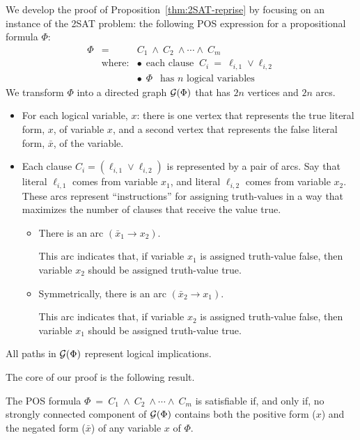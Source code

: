 We develop the proof of Proposition~\ref{thm:2SAT-reprise} by focusing on an instance of the {\sf 2SAT} problem: the following POS expression for a propositional formula $\Phi$:
\begin{eqnarray}
\label{eq:Phi-2SAT}
\Phi & = & C_1 \ \wedge \ C_2 \ \wedge \cdots \wedge \ C_m \\
\nonumber
  & \mbox{where:} & \bullet \ \ \mbox{each clause }
 \ C_i \ = \ \ell_{i,1} \vee \ell_{i,2} \\
\nonumber
  &               & \bullet \ \ \Phi \ \ \mbox{ has $n$ logical variables}
\end{eqnarray}
We transform $\Phi$ into a directed graph $\mbox{$\cal G$}(\Phi)$ that has $2n$ vertices and $2n$ arcs.
\begin{itemize}
\item
For each logical variable, $x$: there is one vertex that represents the {\sc true} literal form, $x$, of variable $x$, and a second vertex that represents the {\sc false} literal form, $\bar{x}$, of the
variable.
\medskip\item
Each clause $C_i = (\ell_{i,1} \vee \ell_{i,2})$ is represented by a pair of arcs.  Say that literal $\ell_{i,1}$ comes from variable $x_1$, and literal $\ell_{i,2}$ comes from variable $x_2$.  These arcs represent ``instructions'' for assigning truth-values in a way that maximizes the number of clauses that receive the value {\sc true}.
  \begin{itemize}
  \item
There is an arc $(\bar{x}_1 \rightarrow x_2)$.

\smallskip

This arc indicates that, if variable $x_1$ is assigned truth-value {\sc false}, then variable $x_2$ should be assigned truth-value {\sc true}.
  \medskip\item
Symmetrically, there is an arc $(\bar{x}_2 \rightarrow x_1)$.

\smallskip

This arc indicates that, if variable $x_2$ is assigned truth-value {\sc false}, then variable $x_1$ should be assigned truth-value {\sc true}.
  \end{itemize}
\end{itemize}
All paths in $\mbox{$\cal G$}(\Phi)$ represent logical implications. 

\medskip

The core of our proof is the following result.

\begin{prop}
\label{prop:2SAT}
The POS formula $\Phi \ = \ C_1 \ \wedge \ C_2 \ \wedge \cdots \wedge \ C_m$ is satisfiable if, and only if, no strongly connected component of $\mbox{$\cal G$}(\Phi)$ contains both the positive form ($x$) and the negated form ($\bar{x}$) of any variable $x$ of $\Phi$.
\end{prop}

